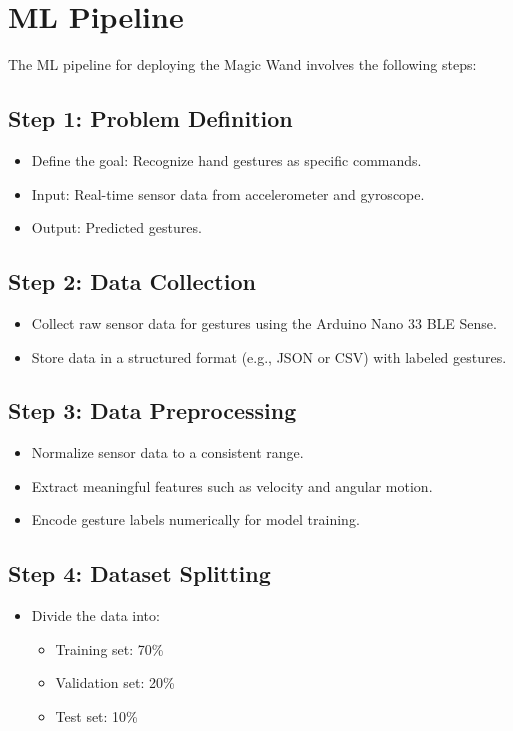 \section{ML Pipeline}

The ML pipeline for deploying the Magic Wand involves the following steps:

\subsection{Step 1: Problem Definition}
\begin{itemize}
	\item Define the goal: Recognize hand gestures as specific commands.
	\item Input: Real-time sensor data from accelerometer and gyroscope.
	\item Output: Predicted gestures.
\end{itemize}

\subsection{Step 2: Data Collection}
\begin{itemize}
	\item Collect raw sensor data for gestures using the Arduino Nano 33 BLE Sense.
	\item Store data in a structured format (e.g., JSON or CSV) with labeled gestures.
\end{itemize}

\subsection{Step 3: Data Preprocessing}
\begin{itemize}
	\item Normalize sensor data to a consistent range.
	\item Extract meaningful features such as velocity and angular motion.
	\item Encode gesture labels numerically for model training.
\end{itemize}

\subsection{Step 4: Dataset Splitting}
\begin{itemize}
	\item Divide the data into:
	\begin{itemize}
		\item Training set: 70\%
		\item Validation set: 20\%
		\item Test set: 10\%
	\end{itemize}
\end{itemize}

